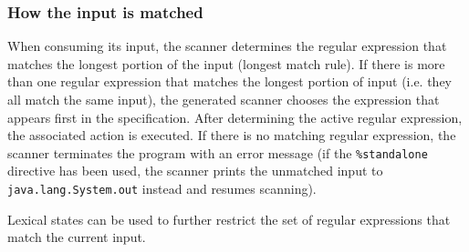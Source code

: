 \documentclass[11pt]{scrartcl}
\begin{document}
\subsubsection{How the input is matched}\label{HowMatched}
When consuming its input, the scanner determines the regular expression
that matches the longest portion of the input (longest match rule). If
there is more than one regular expression that matches the longest portion
of input (i.e. they all match the same input), the generated scanner chooses
the expression that appears first in the specification. After determining
the active regular expression, the associated action is executed. If there
is no matching regular expression, the scanner terminates the program with
an error message (if the \texttt{\%standalone} directive has been used, the
scanner prints the unmatched input to \texttt{java.lang.System.out} instead
and resumes scanning). 

Lexical states can be used to further restrict the set of regular expressions
that match the current input. 
 
\end{document}
